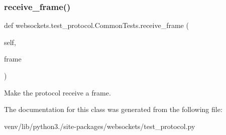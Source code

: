 \subsubsection{\texorpdfstring{receive\+\_\+frame()}{receive\_frame()}}
{\footnotesize\ttfamily def websockets.\+test\+\_\+protocol.\+Common\+Tests.\+receive\+\_\+frame (\begin{DoxyParamCaption}\item[{}]{self,  }\item[{}]{frame }\end{DoxyParamCaption})}

\begin{DoxyVerb}Make the protocol receive a frame.\end{DoxyVerb}
 

The documentation for this class was generated from the following file\+:\begin{DoxyCompactItemize}
\item 
venv/lib/python3./site-\/packages/websockets/test\+\_\+protocol.\+py\end{DoxyCompactItemize}
